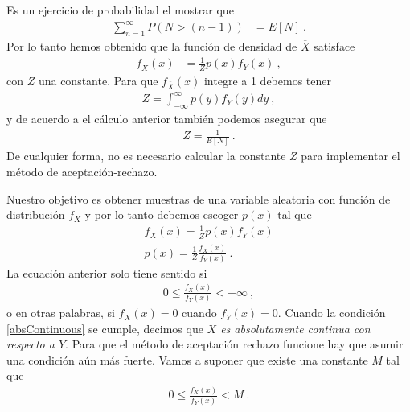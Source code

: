 \documentclass[12pt,reqno]{amsart}\usepackage[]{graphicx}\usepackage[]{color}
\begin{document}
Es un ejercicio de probabilidad el mostrar que
\begin{equation}\label{aceptacionRechazo}
  \begin{split}
  \sum_{n=1}^{\infty} P(N >(n-1))&=E[N]\:.
  \end{split}
\end{equation}
Por lo tanto hemos obtenido que la función de densidad de $\overline{X}$ satisface
\begin{equation}\label{aceptacionRechazo}
  \begin{split}
  f_{\overline{X}}(x)
  &=\frac{1}{Z} p(x) f_{Y}(x) \:,
  \end{split}
\end{equation}
con $Z$ una constante. Para que $f_{\overline{X}}(x)$ integre a 1 debemos tener
\begin{equation}\label{partitionConstant1}
  \begin{split}
  Z = \int_{-\infty}^{\infty} p(y) f_{Y}(y) dy\:,
  \end{split}
\end{equation}
y de acuerdo a el cálculo anterior también podemos asegurar que 
\begin{equation}\label{partitionConstant2}
  \begin{split}
  Z = \frac{1}{E[N]}\:.
  \end{split}
\end{equation}
De cualquier forma, no es necesario calcular la constante $Z$ para implementar el método de aceptación-rechazo.

Nuestro objetivo es obtener muestras de una variable aleatoria con función de distribución $f_{X}$ y por lo tanto debemos escoger $p(x)$ tal que
\begin{equation}
  \begin{split}
  f_{X}(x) = \frac{1}{Z} p(x) f_{Y}(x)\\
  p(x) = \frac{1}{Z} \frac{f_{X}(x)}{f_{Y}(x)}\:.
  \end{split}
\end{equation}
La ecuación anterior solo tiene sentido si
\begin{equation}\label{absContinuous}
  \begin{split}
   0 \leq \frac{f_{X}(x)}{f_{Y}(x)} < +\infty\:,
  \end{split}
\end{equation}
o en otras palabras, si $f_{X}(x)=0$ cuando $f_{Y}(x)=0$. Cuando la condición \eqref{absContinuous} se cumple, decimos que \emph{$X$ es absolutamente continua con respecto a $Y$}. Para que el método de aceptación rechazo funcione hay que asumir una condición aún más fuerte. Vamos a suponer que existe una constante $M$ tal que
\begin{equation}\label{bounded}
  \begin{split}
   0 \leq \frac{f_{X}(x)}{f_{Y}(x)} < M \:.
  \end{split}
\end{equation}
\end{document}
